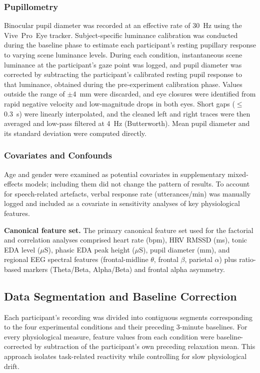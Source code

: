 \documentclass[lettersize,journal]{IEEEtran}
\begin{document}
\subsubsection{Pupillometry}
Binocular pupil diameter was recorded at an effective rate of 30~Hz using the Vive~Pro~Eye tracker. 
Subject-specific luminance calibration was conducted during the baseline phase to estimate each participant’s resting pupillary response to varying scene luminance levels. During each condition, instantaneous scene luminance at the participant’s gaze point was logged, and pupil diameter was corrected by subtracting the participant’s calibrated resting pupil response to that luminance, obtained during the pre-experiment calibration phase.
Values outside the range of $\pm$4~mm were discarded, and eye closures were identified from rapid negative velocity and low-magnitude drops in both eyes. 
Short gaps ($\leq$0.3~s) were linearly interpolated, and the cleaned left and right traces were then averaged and low-pass filtered at 4~Hz (Butterworth).
Mean pupil diameter and its standard deviation were computed directly.


\subsubsection{Covariates and Confounds}
Age and gender were examined as potential covariates in supplementary mixed-effects models; including them did not change the pattern of results.
To account for speech-related artefacts, verbal response rate (utterances/min) was manually logged and included as a covariate in sensitivity analyses of key physiological features.

\noindent\textbf{Canonical feature set.} The primary canonical feature set used for the factorial and correlation analyses comprised heart rate (bpm), HRV RMSSD (ms), tonic EDA level ($\mu$S), phasic EDA peak height ($\mu$S), pupil diameter (mm), and regional EEG spectral features (frontal-midline $\theta$, frontal $\beta$, parietal $\alpha$) plus ratio-based markers (Theta/Beta, Alpha/Beta) and frontal alpha asymmetry.


\subsection{Data Segmentation and Baseline Correction}
Each participant’s recording was divided into contiguous segments corresponding to the four experimental conditions and their preceding 3-minute baselines. For every physiological measure, feature values from each condition were baseline-corrected by subtraction of the participant’s own preceding relaxation mean. This approach isolates task-related reactivity while controlling for slow physiological drift.
\end{document}
